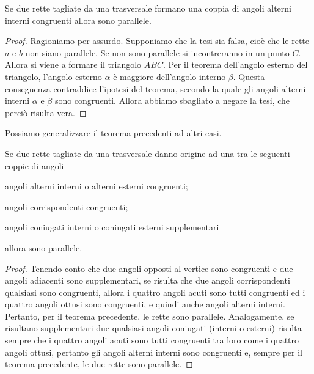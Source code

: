 \begin{teorema}
Se due rette tagliate da una trasversale formano una coppia di angoli alterni interni congruenti allora sono parallele.
\end{teorema}


\begin{proof}
Ragioniamo per assurdo. Supponiamo che la tesi sia falsa, cioè che le rette $a$ e $b$ non siano parallele. Se non sono parallele si incontreranno in un punto $C$. 
Allora si viene a formare il triangolo $ABC$. Per il teorema dell'angolo esterno del triangolo, l'angolo esterno $\alpha$ è maggiore dell'angolo interno $\beta$. Questa conseguenza contraddice l'ipotesi del teorema, secondo la quale gli angoli alterni interni $\alpha$ e $\beta$ sono congruenti. Allora abbiamo sbagliato a negare la tesi, che perciò risulta vera.
\end{proof}

Possiamo generalizzare il teorema precedenti ad altri casi.
\begin{teorema}
Se due rette tagliate da una trasversale danno origine ad una tra le seguenti coppie di angoli
\begin{itemize*}
\item angoli alterni interni o alterni esterni congruenti;
\item angoli corrispondenti congruenti;
\item angoli coniugati interni o coniugati esterni supplementari
\end{itemize*}
allora sono parallele.
\end{teorema}

\begin{proof}
Tenendo conto che due angoli opposti al vertice sono congruenti e due angoli adiacenti sono supplementari, se risulta che due angoli corrispondenti qualsiasi sono congruenti, allora i quattro angoli acuti sono tutti congruenti ed i quattro angoli ottusi sono congruenti, e quindi anche angoli alterni interni. Pertanto, per il teorema precedente, le rette sono parallele. Analogamente, se risultano supplementari due qualsiasi angoli coniugati (interni o esterni) risulta sempre che i quattro angoli acuti sono tutti congruenti tra loro come i quattro angoli ottusi, pertanto gli angoli alterni interni sono congruenti e, sempre per il teorema precedente, le due rette sono parallele.
\end{proof}


